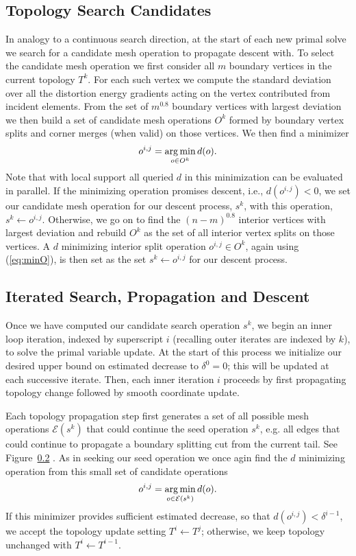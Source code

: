 \subsection{Topology Search Candidates}
In analogy to a continuous search direction, at the start of each new primal solve we search for a candidate mesh operation to propagate descent with. 
%
To select the candidate mesh operation we first consider all $m$ boundary vertices in the current topology $T^k$.  For each such vertex we compute the standard deviation over all the distortion energy gradients acting on the vertex contributed from incident elements. From the set of $m^{0.8}$ boundary vertices with largest deviation we then build a set of candidate mesh operations $O^k$ formed by boundary vertex splits and corner merges (when valid) on those vertices. We then find a minimizer
\begin{align}
\label{eq:minO}
o^{i,j} = \operatorname*{arg\,min}_{o \in O^k} d(o).
\end{align}
Note that with local support all queried $d$ in this minimization can be evaluated in parallel. If the minimizing operation promises descent, i.e., $d(o^{i,j}) < 0$, we set our candidate mesh operation for our descent process, $s^k$, with this operation, $s^k \leftarrow o^{i,j}$. Otherwise, we go on to find the $(n-m)^{0.8}$ interior vertices with largest deviation and rebuild $O^k$ as the set of all interior vertex splits on those vertices. A $d$ minimizing interior split operation $o^{i,j} \in O^k$, again using (\ref{eq:minO}), is then set as the set $s^k \leftarrow o^{i,j}$ for our descent process.

\subsection{Iterated Search, Propagation and Descent}

Once we have computed our candidate search operation $s^k$, we begin an inner loop iteration, indexed by superscript $i$ (recalling outer iterates are indexed by $k$), to solve the primal variable update. At the start of this process we initialize our desired upper bound on estimated decrease to $\delta^0 = 0$; this will be updated at each successive iterate. Then, each inner iteration $i$ proceeds by first propagating topology change followed by smooth coordinate update. 

Each topology propagation step first generates a set of all possible mesh operations $\mathcal{E}(s^k)$ that could continue the seed operation $s^k$, e.g. all edges that could continue to propagate a boundary splitting cut from the current tail. See Figure\ \ref{}  .
As in seeking our seed operation we once agin find the $d$ minimizing operation from this small set of candidate operations
\begin{align}
\label{eq:minE}
o^{i,j} = \operatorname*{arg\,min}_{o \in \mathcal{E}(s^k)} d(o).
\end{align}
If this minimizer provides sufficient estimated decrease, so that $d(o^{i,j}) < \delta^{i-1}$, we accept the topology update setting $T^i \leftarrow T^j$; otherwise, we keep topology unchanged with $T^i \leftarrow T^{i-1}.$ 

